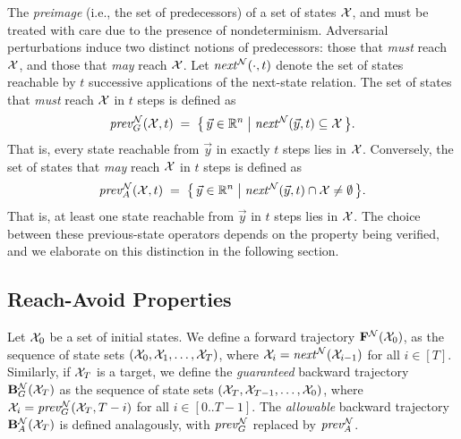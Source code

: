 \documentclass[letterpaper, 10 pt, conference]{ieeeconf}  %
\newcommand{\cb}[1]{\noindent\textcolor{magenta}{\newline CB: #1}}
\newcommand{\cb}[1]{}
\begin{document}
  
The \emph{preimage} (i.e., the set of predecessors) of a set of states $\mathcal{X}$, and must be treated with care due to the presence of nondeterminism. Adversarial perturbations induce two distinct notions of predecessors: those that \emph{must} reach $\mathcal{X}$, and those that \emph{may} reach $\mathcal{X}$. Let $\mathit{next}^{\mathcal{N}}(\cdot, t)$ denote the set of states reachable by $t$ successive applications of the next-state relation. The set of states that \emph{must} reach $\mathcal{X}$ in $t$ steps is defined as
\begin{align}
    \mathit{prev}_G^{\mathcal{N}}(\mathcal{X}, t)
    \;=\;
    \big\{\, \vec{y} \in \mathbb{R}^n \;\big|\; \mathit{next}^{\mathcal{N}}(\vec{y}, t) \subseteq \mathcal{X} \,\big\}.
    \label{eq:prev_must_t}
\end{align}
That is, every state reachable from $\vec{y}$ in exactly $t$ steps lies in $\mathcal{X}$.
Conversely, the set of states that \emph{may} reach $\mathcal{X}$ in $t$ steps is defined as
\begin{align}
    \mathit{prev}_A^{\mathcal{N}}(\mathcal{X}, t)
    \;=\;
    \big\{\, \vec{y} \in \mathbb{R}^n \;\big|\; \mathit{next}^{\mathcal{N}}(\vec{y}, t) \cap \mathcal{X} \neq \emptyset \,\big\}.
    \label{eq:prev_may_t}
\end{align}
That is, at least one state reachable from $\vec{y}$ in $t$ steps lies in $\mathcal{X}$.
The choice between these previous-state operators depends on the property being verified, and we elaborate on this distinction in the following section.
\subsection{Reach-Avoid Properties}
Let $\mathcal{X}_0$ be a set of initial states.
We define a forward trajectory $\mathbf{F}^{\mathcal{N}}(\mathcal{X}_0)$, as the sequence of state sets $(\mathcal{X}_0, \mathcal{X}_1, \dots, \mathcal{X}_T)$, where $\mathcal{X}_i = \mathit{next}^{\mathcal{N}}(\mathcal{X}_{i-1})$ for all $i \in [T]$. 
Similarly, if $\mathcal{X}_T$ is a target, we define the \emph{guaranteed} backward trajectory $\mathbf{B}_G^{\mathcal{N}}(\mathcal{X}_T)$ as the sequence of state sets $(\mathcal{X}_T, \mathcal{X}_{T-1}, \dots, \mathcal{X}_0)$, where $\mathcal{X}_i = \mathit{prev}_G^{\mathcal{N}}(\mathcal{X}_T, T-i)$ for all $i \in [0..T-1]$. The \emph{allowable} backward trajectory $\mathbf{B}_A^{\mathcal{N}}(\mathcal{X}_T)$ is defined analagously, with $\mathit{prev}_G^\mathcal{N}$ replaced by $\mathit{prev}_A^\mathcal{N}$.
\end{document}
